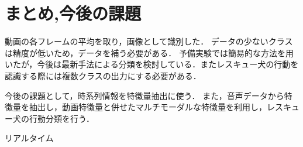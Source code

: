 \chapter{まとめ,今後の課題}
動画の各フレームの平均を取り，画像として識別した．
データの少ないクラスは精度が低いため，データを補う必要がある．
予備実験では簡易的な方法を用いたが，今後は最新手法による分類を検討している．またレスキュー犬の行動を認識する際には複数クラスの出力にする必要がある．


今後の課題として，時系列情報を特徴量抽出に使う．
また，音声データから特徴量を抽出し，動画特徴量と併せたマルチモーダルな特徴量を利用し，レスキュー犬の行動分類を行う．

リアルタイム

{\scriptsize %
%


}
% 
% 


